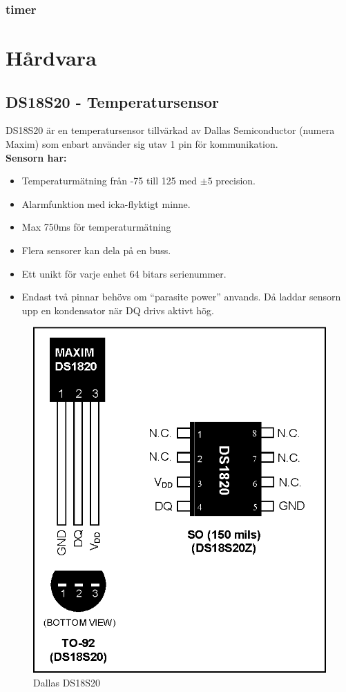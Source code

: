 \documentclass[a4paper]{scrreprt}
\begin{document}
\subsubsection{timer}






\clearpage
\section{Hårdvara}\label{sec:hårdvara}
\subsection{DS18S20 - Temperatursensor}
DS18S20 är en temperatursensor tillvärkad av Dallas Semiconductor (numera Maxim) som enbart använder sig utav 1 pin för kommunikation. 
\\
\textbf{Sensorn har:}
\begin{itemize}
	\item Temperaturmätning från -75\degcel{} till 125\degcel{} med $\pm5$ precision.
	\item Alarmfunktion med icka-flyktigt minne.
	\item Max 750ms för temperaturmätning
	\item Flera sensorer kan dela på en buss.
	\item Ett unikt för varje enhet 64 bitars serienummer.
	\item Endast två pinnar behövs om ``parasite power'' anvands. Då laddar sensorn upp en kondensator när DQ drivs aktivt hög.
\end{itemize}
\begin{figure}[htp]
	\centering
	\includegraphics[scale=0.8]{ds18s20_hardware.eps}
	\caption{Dallas DS18S20}
\end{figure}
\end{document}
